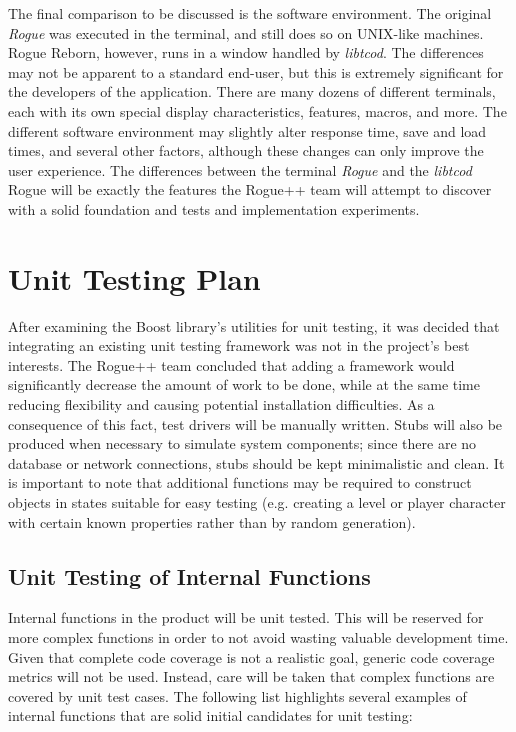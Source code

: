 \documentclass[12pt, titlepage]{article}
\begin{document}
	The final comparison to be discussed is the software environment.  The original \textit{Rogue} was executed in the terminal, and still does so on UNIX-like machines.  Rogue Reborn, however, runs in a window handled by \textit{libtcod}.  The differences may not be apparent to a standard end-user, but this is extremely significant for the developers of the application.  There are many dozens of different terminals, each with its own special display characteristics, features, macros, and  more.  The different software environment may slightly alter response time, save and load times, and several other factors, although these changes can only improve the user experience.  The differences between the terminal \textit{Rogue} and the \textit{libtcod} Rogue will be exactly the features the Rogue++ team will attempt to discover with a solid foundation and tests and implementation experiments.
	
	
\newpage
\section{Unit Testing Plan}
\label{section6}
	
	After examining the Boost library's utilities for unit testing, it was decided that integrating an existing unit testing framework was not in the project's best interests.  The Rogue++ team concluded that adding a framework would significantly decrease the amount of work to be done, while at the same time reducing flexibility and causing potential installation difficulties.  As a consequence of this fact, test drivers will be manually written.  Stubs will also be produced when necessary to simulate system components; since there are no database or network connections, stubs should be kept minimalistic and clean.  It is important to note that additional functions may be required to construct objects in states suitable for easy testing (e.g. creating a level or player character with certain known properties rather than by random generation).
	
	\subsection{Unit Testing of Internal Functions}
		Internal functions in the product will be unit tested.  This will be reserved for more complex functions in order to not avoid wasting valuable development time.  Given that complete code coverage is not a realistic goal, generic code coverage metrics will not be used.  Instead, care will be taken that complex functions are covered by unit test cases.  The following list highlights several examples of internal functions that are solid initial candidates for unit testing:
\end{document}
